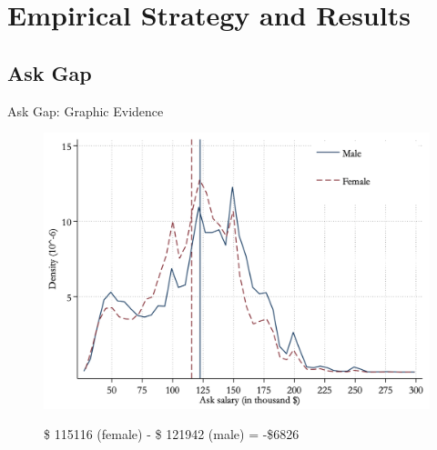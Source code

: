 \section{Empirical Strategy and Results}

\frame{\sectionpage}
 
\subsection*{Ask Gap}
\begin{frame}{Ask Gap: Graphic Evidence}
    \begin{figure}
        \centering
        \includegraphics[height = 0.7 \textheight]{images/askgap.png}
       
        {\footnotesize \textcolor{frenchlilac!45!white}{\$ 115116} (female) - \textcolor{frenchlilac!45!white}{\$ 121942} (male) = \textcolor{frenchlilac!45!white}{-\$6826}}
    \end{figure}
\end{frame}

